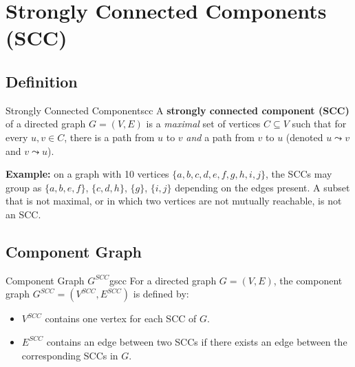 
\section*{Strongly Connected Components (SCC)}

\subsection{Definition}

\begin{definition}{Strongly Connected Component}{scc}
A \textbf{strongly connected component (SCC)} of a directed graph
$G = (V, E)$ is a \emph{maximal} set of vertices $C \subseteq V$
such that for every $u, v \in C$, there is a path from $u$ to $v$
\emph{and} a path from $v$ to $u$ (denoted $u \leadsto v$ and $v \leadsto u$).
\end{definition}

\textbf{Example:} on a graph with 10 vertices $\{a, b, c, d, e, f, g, h, i, j\}$,
the SCCs may group as $\{a, b, e, f\}$, $\{c, d, h\}$, $\{g\}$, $\{i, j\}$
depending on the edges present. A subset that is not maximal, or in which
two vertices are not mutually reachable, is not an SCC.

\subsection{Component Graph}

\begin{definition}{Component Graph $G^{SCC}$}{gscc}
For a directed graph $G = (V, E)$, the component graph
$G^{SCC} = (V^{SCC}, E^{SCC})$ is defined by:
\begin{itemize}[noitemsep]
  \item $V^{SCC}$ contains one vertex for each SCC of $G$.
  \item $E^{SCC}$ contains an edge between two SCCs if there exists an edge
        between the corresponding SCCs in $G$.
\end{itemize}
\end{definition}

